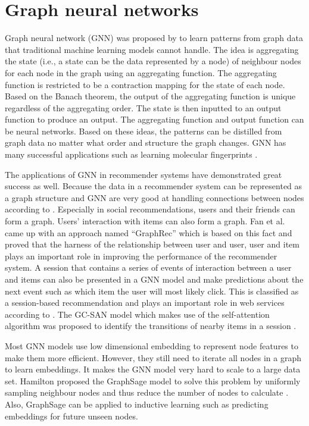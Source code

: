 \documentclass[11pt,twoside]{report}
\begin{document}
\section{Graph neural networks}
Graph neural network (GNN) was proposed by \cite{gori_new_2005, scarselli_graph_2009} to learn patterns from graph data that traditional machine learning models cannot handle. The idea is aggregating the state (i.e., a state can be the data represented by a node) of neighbour nodes for each node in the graph using an aggregating function. The aggregating function is restricted to be a contraction mapping for the state of each node. Based on the Banach theorem, the output of the aggregating function is unique regardless of the aggregating order. The state is then inputted to an output function to produce an output. The aggregating function and output function can be neural networks. Based on these ideas, the patterns can be distilled from graph data no matter what order and structure the graph changes. GNN has many successful applications such as learning molecular fingerprints \cite{duvenaud_convolutional_2015}.

The applications of GNN in recommender systems have demonstrated great success as well. Because the data in a recommender system can be represented as a graph structure and GNN are very good at handling connections between nodes according to \cite{wu_graph_2020}. Especially in social recommendations, users and their friends can form a graph. Users’ interaction with items can also form a graph. Fan et al. came up with an approach named “GraphRec” which is based on this fact \cite{fan_graph_2019} and proved that the harness of the relationship between user and user, user and item plays an important role in improving the performance of the recommender system. A session that contains a series of events of interaction between a user and items can also be presented in a GNN model and make predictions about the next event such as which item the user will most likely click. This is classified as a session-based recommendation and plays an important role in web services according to \cite{xu_graph_2019}. The GC-SAN model which makes use of the self-attention algorithm was proposed to identify the transitions of nearby items in a session \cite{xu_graph_2019}.

Most GNN models use low dimensional embedding to represent node features to make them more efficient. However, they still need to iterate all nodes in a graph to learn embeddings. It makes the GNN model very hard to scale to a large data set. Hamilton \cite{hamilton_inductive_2018} proposed the GraphSage model to solve this problem by uniformly sampling neighbour nodes and thus reduce the number of nodes to calculate \cite{hamilton_inductive_2018}. Also, GraphSage can be applied to inductive learning such as predicting embeddings for future unseen nodes.
\end{document}
